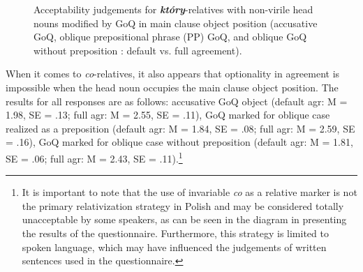 \documentclass[output=paper]{langsci/langscibook}
\begin{document}
\begin{figure}
\caption{Acceptability judgements for \textbf{\textit{który}}{}-relatives with non-virile head nouns modified by GoQ in main clause object position (accusative GoQ, oblique prepositional phrase (PP) GoQ, and oblique GoQ without preposition : default vs. full agreement).}
\label{fig:leska:1}
\end{figure}

When it comes to \textit{co}{}-relatives, it also appears that optionality in agreement is impossible when the head noun occupies the main clause object position. The results for all responses are as follows: accusative GoQ object (default agr: M = 1.98, SE = .13; full agr: M = 2.55, SE = .11), GoQ marked for oblique case realized as a preposition (default agr: M = 1.84, SE = .08; full agr: M = 2.59, SE = .16), GoQ marked for oblique case without preposition (default agr: M = 1.81, SE = .06; full agr: M = 2.43, SE = .11).\footnote{It is important to note that the use of invariable \textit{co} as a relative marker is not the primary relativization strategy in Polish and may be considered totally unacceptable by some speakers, as can be seen in the diagram in  presenting the results of the questionnaire. Furthermore, this strategy is limited to spoken language, which may have influenced the judgements of written sentences used in the questionnaire.} 
\end{document}

